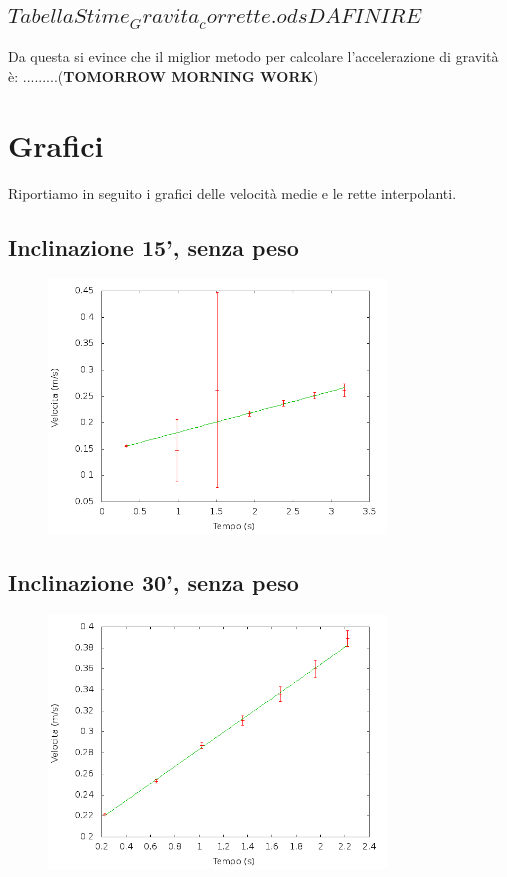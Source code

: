\documentclass[12pt]{article} %
\begin{document}
	\subsection {$Tabella Stime_Gravita_corrette.ods DA FINIRE$}
Da questa si evince che il miglior metodo per calcolare l'accelerazione di gravità è: .........(\textbf{TOMORROW MORNING WORK})

\newpage
\section {Grafici}
	Riportiamo in seguito i grafici delle velocità medie e le rette interpolanti.
	\subsection{Inclinazione 15', senza peso}
	\begin{figure}[H]
		\centering
		\includegraphics[width=0.8\textwidth]{velocita_15gradi_normale}
		\label{fig:15n}
	\end{figure}
 
	\subsection {Inclinazione 30', senza peso}
	\begin{figure}[H]
		\centering
		\includegraphics[width=0.8\textwidth]{velocita_30gradi_normale}
		\label{fig:30n}
	\end{figure}
	
\end{document}
